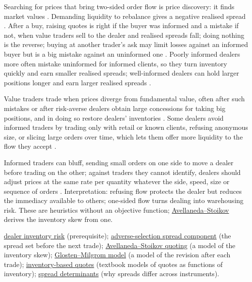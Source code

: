 \begin{qfmethod}
 Searching for prices that bring two-sided order flow is price discovery: it finds market values \citep[chap.~``Dealers'', p.~284]{alpha-harris}. Demanding liquidity to rebalance gives a negative realised spread \citep[same chap., p.~284]{alpha-harris}. After a buy, raising quotes is right if the buyer was informed and a mistake if not, when value traders sell to the dealer and realised spreads fall; doing nothing is the reverse; buying at another trader's ask may limit losses against an informed buyer but is a big mistake against an uninformed one \citep[same chap., pp.~291--292, Table~13-4]{alpha-harris}. Poorly informed dealers more often mistake uninformed for informed clients, so they turn inventory quickly and earn smaller realised spreads; well-informed dealers can hold larger positions longer and earn larger realised spreads \citep[same chap., pp.~292--294]{alpha-harris}.

Value traders trade when prices diverge from fundamental value, often after such mistakes or after risk-averse dealers obtain large concessions for taking big positions, and in doing so restore dealers' inventories \citep[same chap., pp.~291 and~294]{alpha-harris}. Some dealers avoid informed traders by trading only with retail or known clients, refusing anonymous size, or slicing large orders over time, which lets them offer more liquidity to the flow they accept \citep[same chap., pp.~290--291]{alpha-harris}.

 Informed traders can bluff, sending small orders on one side to move a dealer before trading on the other; against traders they cannot identify, dealers should adjust prices at the same rate per quantity whatever the side, speed, size or sequence of orders \citep[same chap., pp.~292 and~294]{alpha-harris}. Interpretation: refusing flow protects the dealer but reduces the immediacy available to others; one-sided flow turns dealing into warehousing risk. These are heuristics without an objective function; \hyperref[mod:avellaneda-stoikov]{Avellaneda--Stoikov} derives the inventory skew from one.

 \hyperref[def:dealer-inventory-risk]{dealer inventory risk} (prerequisite); \hyperref[res:adverse-selection-spread-component]{adverse-selection spread component} (the spread set before the next trade); \hyperref[mod:avellaneda-stoikov]{Avellaneda--Stoikov quoting} (a model of the inventory skew); \hyperref[mod:glosten-milgrom]{Glosten--Milgrom model} (a model of the revision after each trade); \hyperref[mod:inventory-based-quotes]{inventory-based quotes} (textbook models of quotes as functions of inventory); \hyperref[res:spread-determinants]{spread determinants} (why spreads differ across instruments).

\end{qfmethod}


